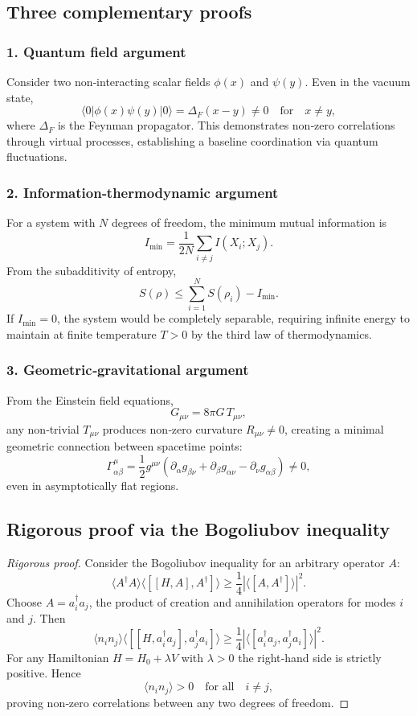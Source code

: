 \documentclass[11pt,a4paper]{article}
\begin{document}
\subsection{Three complementary proofs}

\subsubsection*{1. Quantum field argument}
Consider two non‑interacting scalar fields \(\phi(x)\) and \(\psi(y)\).
Even in the vacuum state,
\[
\langle 0 | \phi(x) \psi(y) | 0 \rangle = \Delta_F(x-y) \neq 0 \quad
\text{for} \quad x \neq y,
\]
where \(\Delta_F\) is the Feynman propagator. This demonstrates
non‑zero correlations through virtual processes, establishing a
baseline coordination via quantum fluctuations.

\subsubsection*{2. Information‑thermodynamic argument}
For a system with \(N\) degrees of freedom, the minimum mutual
information is
\[
I_{\min} = \frac{1}{2N} \sum_{i \neq j} I(X_i; X_j).
\]
From the subadditivity of entropy,
\[
S(\rho) \leq \sum_{i=1}^N S(\rho_i) - I_{\min}.
\]
If \(I_{\min}=0\), the system would be completely separable, requiring
infinite energy to maintain at finite temperature \(T>0\) by the third
law of thermodynamics.

\subsubsection*{3. Geometric‑gravitational argument}
From the Einstein field equations,
\[
G_{\mu\nu} = 8\pi G \, T_{\mu\nu},
\]
any non‑trivial \(T_{\mu\nu}\) produces non‑zero curvature \(R_{\mu\nu} \neq 0\),
creating a minimal geometric connection between spacetime points:
\[
\Gamma^{\mu}_{\alpha\beta} = \frac{1}{2} g^{\mu\nu}(\partial_\alpha g_{\beta\nu}
+ \partial_\beta g_{\alpha\nu} - \partial_\nu g_{\alpha\beta}) \neq 0,
\]
even in asymptotically flat regions.

\subsection{Rigorous proof via the Bogoliubov inequality}

\begin{proof}[Rigorous proof]
	Consider the Bogoliubov inequality for an arbitrary operator \(A\):
	\[
	\langle A^\dagger A \rangle \langle [[H, A], A^\dagger] \rangle
	\geq \frac{1}{4} |\langle [A, A^\dagger] \rangle|^2.
	\]
	Choose \(A = a_i^\dagger a_j\), the product of creation and annihilation
	operators for modes \(i\) and \(j\). Then
	\[
	\langle n_i n_j \rangle \langle [[H, a_i^\dagger a_j], a_j^\dagger a_i] \rangle
	\geq \frac{1}{4} |\langle [a_i^\dagger a_j, a_j^\dagger a_i] \rangle|^2.
	\]
	For any Hamiltonian \(H = H_0 + \lambda V\) with \(\lambda > 0\) the
	right‑hand side is strictly positive. Hence
	\[
	\langle n_i n_j \rangle > 0 \quad \text{for all} \quad i \neq j,
	\]
	proving non‑zero correlations between any two degrees of freedom.
\end{proof}
\end{document}
